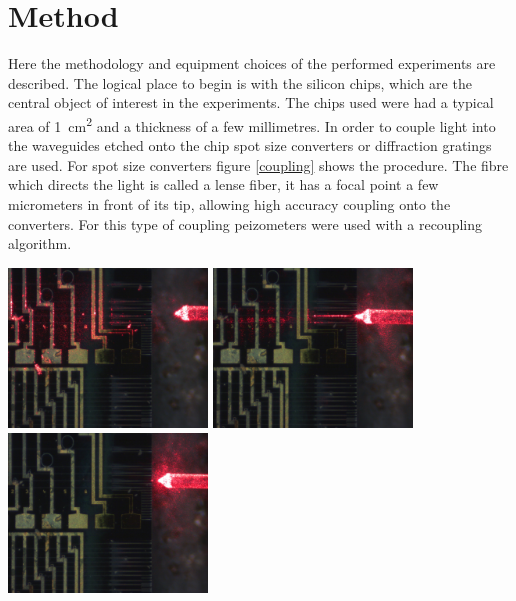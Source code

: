 \section{Method}
Here the methodology and equipment choices of the performed experiments are described. The logical place to begin is with the silicon chips, which are the central object of interest in the experiments. The chips used were had a typical area of \SI{1}{\centi\meter^2} and a thickness of a few millimetres. In order to couple light into the waveguides etched onto the chip spot size converters or diffraction gratings are used. For spot size converters figure \ref{coupling} shows the procedure. The fibre which directs the light is called a lense fiber, it has a focal point a few micrometers in front of its tip, allowing high accuracy coupling onto the converters. For this type of coupling peizometers were used with a recoupling algorithm. 
\newline

\begingroup
    \centering  
    \includegraphics[width=5.3cm]{img/method/chipPictures/redLaser_aboveChip.jpg}
    \includegraphics[width=5.3cm]{img/method/chipPictures/redLaser_coupled.jpg}
    \includegraphics[width=5.3cm]{img/method/chipPictures/redLaser_belowChip.jpg}
     \vspace{3pt} \label{sideCoupling}
\endgroup

